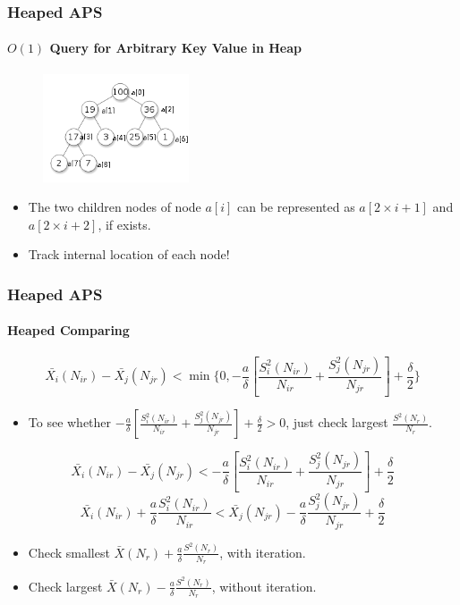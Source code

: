 \documentclass{beamer}
\begin{document}
\begin{frame}
\frametitle{Heaped APS}
\framesubtitle{$O(1)$ Query for Arbitrary Key Value in Heap}
\begin{figure}[ht]
\centering
\includegraphics[height=32mm]{heap2.png}
\end{figure}
\begin{itemize}
\item The two children nodes of node $a[i]$ can be represented as $a[2 \times i + 1]$ and $a[2 \times i + 2]$, if exists.
\item Track internal location of each node!
\end{itemize}

\end{frame}

\begin{frame}
\frametitle{Heaped APS}
\framesubtitle{Heaped Comparing}
$$ \bar{X_{i}}(N_{ir}) - \bar{X_{j}}(N_{jr}) < \min\{0, -\frac{a}{\delta}[\frac{S_i^2(N_{ir})}{N_{ir}} + \frac{S_j^2(N_{jr})}{N_{jr}}] + \frac{\delta}{2}\} $$
\begin{itemize}
\item To see whether $ -\frac{a}{\delta}[\frac{S_i^2(N_{ir})}{N_{ir}} + \frac{S_j^2(N_{jr})}{N_{jr}}] + \frac{\delta}{2} > 0$, just check largest $\frac{S^2(N_r)}{N_r}$.
\end{itemize}
$$ \bar{X_{i}}(N_{ir}) - \bar{X_{j}}(N_{jr}) < -\frac{a}{\delta}[\frac{S_i^2(N_{ir})}{N_{ir}} + \frac{S_j^2(N_{jr})}{N_{jr}}] + \frac{\delta}{2} $$
$$ \bar{X_{i}}(N_{ir}) + \frac{a}{\delta}\frac{S_i^2(N_{ir})}{N_{ir}} < \bar{X_{j}}(N_{jr}) - \frac{a}{\delta}\frac{S_j^2(N_{jr})}{N_{jr}} + \frac{\delta}{2} $$
\begin{itemize}
\item Check smallest $\bar{X}(N_r) + \frac{a}{\delta}\frac{S^2(N_r)}{N_r}$, with iteration.
\item Check largest $\bar{X}(N_r) - \frac{a}{\delta}\frac{S^2(N_r)}{N_r}$, without iteration.
\end{itemize}
\end{frame}
\end{document}
